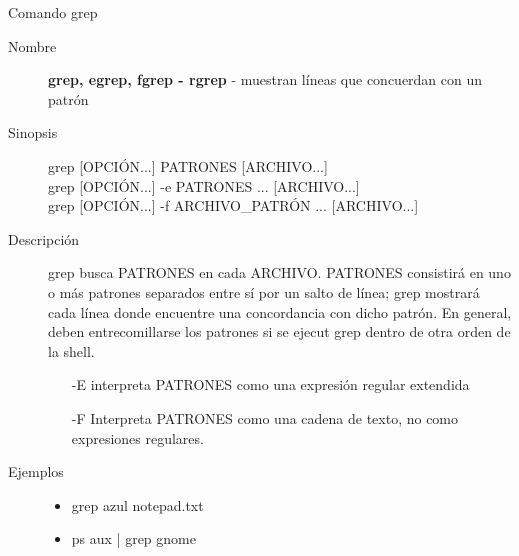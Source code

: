 \begin{frame}[c]{Comando grep}
  \begin{description}
    \item[Nombre]
      \textbf{grep, egrep, fgrep - rgrep} - muestran líneas que concuerdan
      con un patrón

    \vspace{\baselineskip}
    \item[Sinopsis]
      grep [OPCIÓN...] PATRONES [ARCHIVO...] \\
      grep [OPCIÓN...] -e PATRONES ... [ARCHIVO...] \\
      grep [OPCIÓN...] -f ARCHIVO\_PATRÓN ... [ARCHIVO...]

    \vspace{\baselineskip}
    \item[Descripción]
      grep busca PATRONES en cada ARCHIVO. PATRONES consistirá en uno o más
      patrones separados entre sí por un salto de línea; grep mostrará cada
      línea donde encuentre una concordancia con dicho patrón. En general,
      deben entrecomillarse los patrones si se ejecut grep dentro de otra
      orden de la shell.

      \begin{itemize}
        \item [-E] interpreta PATRONES como una expresión regular extendida
        \item [-F] Interpreta PATRONES como una cadena de texto, no como
          expresiones regulares.
      \end{itemize}

    \vspace{\baselineskip}
    \item[Ejemplos]
      \begin{itemize}
        \item grep azul notepad.txt
        \item ps aux | grep gnome
      \end{itemize}
  \end{description}
\end{frame}

